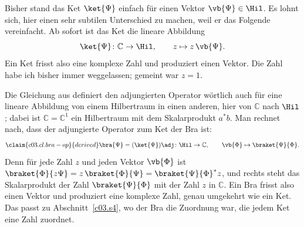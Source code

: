 Bisher stand das Ket $\ket{\Psi}$ einfach für einen Vektor $\vb{\Psi} \in \Hil$. Es lohnt sich,
hier einen sehr subtilen Unterschied zu machen, weil er das Folgende vereinfacht. Ab sofort ist
das Ket die lineare Abbildung
\begin{equation}\label{c03.eq.ket-op}
  \ket{\Psi}\colon \mathbb{C} \to \Hil ,
  \qquad
  z \mapsto z\, \vb{\Psi} .
\end{equation}
Ein Ket frisst also eine komplexe Zahl und produziert einen Vektor. Die Zahl habe ich bisher
immer weggelassen; gemeint war $z = 1$.

Die Gleichung aus  definiert den adjungierten Operator wörtlich auch für eine
lineare Abbildung von einem Hilbertraum in einen anderen, hier von $\mathbb{C}$ nach $\Hil$; dabei
ist $\mathbb{C} = \mathbb{C}^1$ ein Hilbertraum mit dem Skalarprodukt $a^* b$. Man rechnet nach,
dass der adjungierte Operator zum Ket der Bra ist:
\begin{equation}\label{c03.eq.bra-op}\claim{c03.cl.bra-op}{derived}
  \bra{\Psi} = (\ket{\Psi})\adj \colon \Hil \to \mathbb{C} ,
  \qquad
  \vb{\Phi} \mapsto \braket{\Psi}{\Phi} .
\end{equation}
Denn für jede Zahl $z$ und jeden Vektor $\vb{\Phi}$ ist
$\braket{\Phi}{z\Psi} = z\, \braket{\Phi}{\Psi} = \braket{\Psi}{\Phi}^* z$, und rechts steht das
Skalarprodukt der Zahl $\braket{\Psi}{\Phi}$ mit der Zahl $z$ in $\mathbb{C}$. Ein Bra frisst
also einen Vektor und produziert eine komplexe Zahl, genau umgekehrt wie ein Ket. Das passt zu
Abschnitt~\ref{c03.s4}, wo der Bra die Zuordnung war, die jedem Ket eine Zahl zuordnet.

